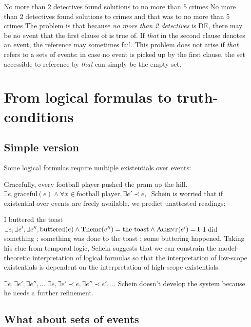 \pex
\a No more than 2 detectives found solutions to no more than 5 crimes
\a No more than 2 detectives found solutions to crimes and that was to no more than 5 crimes
\xe
%
The problem is that because \emph{no more than 2 detectives} is DE, there may be no event that the first clause of \clastx[b] is true of. If \emph{that} in the second clause denotes an event, the reference may sometimes fail.
%
This problem does not arise if \emph{that} refers to a sets of events: in case no event is picked up by the first clause, the set accessible to reference by \emph{that} can simply be the empty set.

\section{From logical formulas to truth-conditions}

\subsection{Simple version}

Some logical formulas require multiple existentials over events:

\pex
\a Gracefully, every football player pushed the pram up the hill.
\a $\exists e, \text{graceful}(e) \wedge \forall x\in \text{football player}, \exists{e'\prec e},\ $
\xe
%
Schein is worried that if existential over events are freely available\footnotemark, we predict unattested readings:

\pex
I buttered the toast
\a 
$\exists e,\exists e',\exists e'', \text{buttered}(e) \wedge\text{Theme}(e'') = \text{the toast} \wedge\textsc{Agent}(e') = \text{I} $
\a 
I did something ; something was done to the toast ; some buttering happened.
\xe
%
Taking his clue from temporal logic, Schein suggests that we can constrain the model-theoretic interpretation of logical formulas so that the interpretation of low-scope existentials is dependent on the interpretation of high-scope existentials.

\startbox{5cm}
\pex
\a {} $\exists e,\exists e',\exists e'', \ldots$
\a {} $\exists e,\exists e'\prec e,\exists e'' \prec e', \ldots$
\xe
%
Schein doesn't develop the system because he needs a further refinement.

\subsection{What about sets of events}

